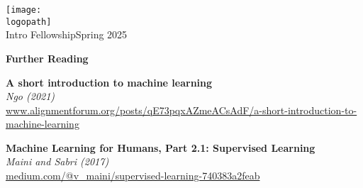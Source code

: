 \documentclass[12pt]{article}
\def\logopath{../assets/caiac_logo.png}  %
\begin{document}
\thispagestyle{empty} %

\begin{center}
    \texttt{[image: \\logopath]}\\
    \vspace{0.2em}
    {\color{primaryFaded}Intro Fellowship\color{primaryFaded}Spring 2025}
\end{center}

\vspace{1em}

\begin{center}
    {\LARGE \textbf{Further Reading}}
\end{center}

\vspace{1em}

\noindent\textbf{A short introduction to machine learning}\\
\textit{Ngo (2021)}\\
{\small \url{www.alignmentforum.org/posts/qE73pqxAZmeACsAdF/a-short-introduction-to-machine-learning}}

\vspace{1em}
\noindent\textbf{Machine Learning for Humans, Part 2.1: Supervised Learning}\\
\textit{Maini and Sabri (2017)}\\
{\small \url{medium.com/@v_maini/supervised-learning-740383a2feab}}

\vspace{1em}


\vspace{4em}
\end{document}
